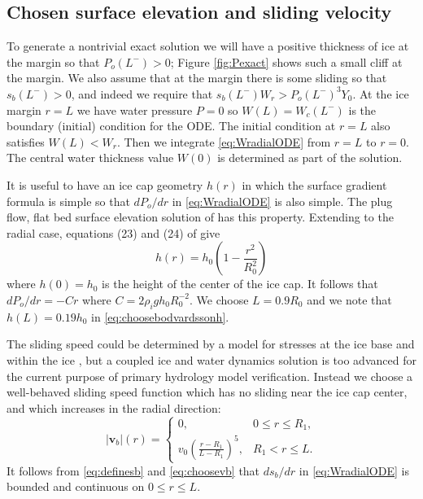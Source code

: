 \documentclass[11pt,final]{amsart}%
\newcommand\bv{\mathbf{v}}
\begin{document}
\subsection*{Chosen surface elevation and sliding velocity}  To generate a nontrivial exact solution we will have a positive thickness of ice at the margin so that $P_o(L^-)>0$; Figure \ref{fig:Pexact} shows such a small cliff at the margin.  We also assume that at the margin there is some sliding so that $s_b(L^-)>0$, and indeed we require that $s_b(L^-) W_r > P_o(L^-)^3 Y_0$.  At the ice margin $r=L$ we have water pressure $P=0$ so $W(L)=W_c(L^-)$ is the boundary (initial) condition for the ODE.  The initial condition at $r=L$ also satisfies $W(L) < W_r$.  Then we integrate \eqref{eq:WradialODE} from $r=L$ to $r=0$.  The central water thickness value $W(0)$ is determined as part of the solution.

It is useful to have an ice cap geometry $h(r)$ in which the surface gradient formula is simple so that $dP_o/dr$ in \eqref{eq:WradialODE} is also simple.  The plug flow, flat bed surface elevation solution of \cite{Bodvardsson} has this property.  Extending to the radial case, equations (23) and (24) of \citep{Bodvardsson} give
\begin{equation}
h(r) = h_0 \left(1 - \frac{r^2}{R_0^2} \right) \label{eq:choosebodvardssonh}
\end{equation}
where $h(0)=h_0$ is the height of the center of the ice cap.  It follows that $dP_o/dr = - C r$ where $C=2\rho_i g h_0 R_0^{-2}$.  We choose $L=0.9 R_0$ and we note that $h(L)=0.19 h_0$ in \eqref{eq:choosebodvardssonh}.

The sliding speed could be determined by a model for stresses at the ice base and within the ice \citep{GreveBlatter2009}, but a coupled ice and water dynamics solution is too advanced for the current purpose of primary hydrology model verification.  Instead we choose a well-behaved sliding speed function which has no sliding near the ice cap center, and which increases in the radial direction:
\begin{equation}
|\bv_b|(r) = \begin{cases} 0, & 0 \le r \le R_1, \\
                           v_0  \left(\frac{r-R_1}{L-R_1}\right)^5, & R_1 < r \le L.
             \end{cases}  \label{eq:choosevb}
\end{equation}
It follows from \eqref{eq:definesb} and \eqref{eq:choosevb} that $ds_b/dr$ in \eqref{eq:WradialODE} is bounded and continuous on $0\le r \le L$.
\end{document}
